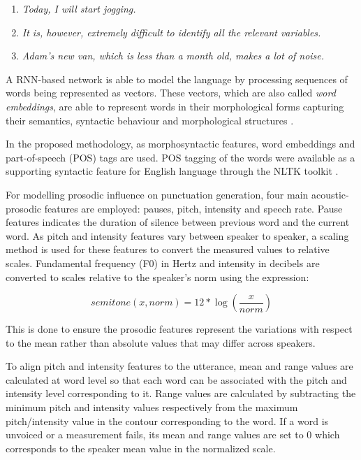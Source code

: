 \begin{enumerate}
    \item \textit{Today, I will start jogging.}
    \item \textit{It is, however, extremely difficult to identify all the relevant variables.}
    \item \textit{Adam’s new van, which is less than a month old, makes a lot of noise.}
\end{enumerate}

A RNN-based network is able to model the language by processing sequences of words being represented as vectors. These vectors, which are also called \textit{word embeddings}, are able to represent words in their morphological forms capturing their semantics, syntactic behaviour and morphological structures \citep{ballesterosneural}. 

In the proposed methodology, as morphosyntactic features, word embeddings and part-of-speech (POS) tags are used. POS tagging of the words were available as a supporting syntactic feature for English language through the NLTK toolkit \citep{nltk}.

For modelling prosodic influence on punctuation generation, four main acoustic-prosodic features are employed: pauses, pitch, intensity and speech rate. Pause features indicates the duration of silence between previous word and the current word. As pitch and intensity features vary between speaker to speaker, a scaling method is used for these features to convert the measured values to relative scales. Fundamental frequency (F0) in Hertz and intensity in decibels are converted to scales relative to the speaker's norm using the expression:

\begin{equation}
  semitone(x, norm) = 12 * \log (\dfrac{x}{norm})
  \label{semitone_formula}
\end{equation}

\noindent This is done to ensure the prosodic features represent the variations with respect to the mean rather than absolute values that may differ across speakers.  

To align pitch and intensity features to the utterance, mean and range values are calculated at word level so that each word can be associated with the pitch and intensity level corresponding to it. Range values are calculated by subtracting the minimum pitch and intensity values respectively from the maximum pitch/intensity value in the contour corresponding to the word. If a word is unvoiced or a measurement fails, its mean and range values are set to 0 which corresponds to the speaker mean value in the normalized scale.

